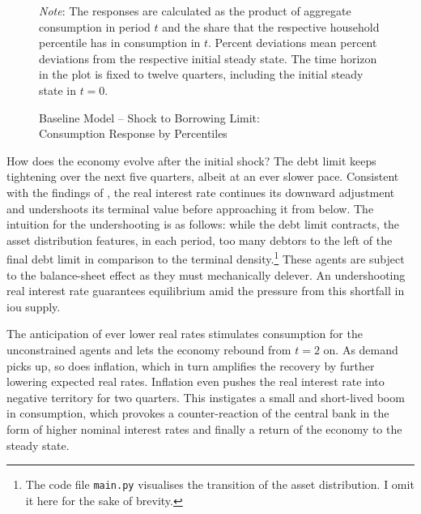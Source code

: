 \documentclass[a4paper,12pt]{article} %
\numberwithin{equation}{section} %
\numberwithin{figure}{section}
\numberwithin{table}{section}
\begin{document}
\begin{figure}[t]
    \centering
    \caption{Baseline Model -- Shock to Borrowing Limit: \\ Consumption Response by Percentiles}
    \label{fig:baseline-permanent-limit-dist-c-response}
    

    \vspace{10pt}
    
    \begin{minipage}{0.75\textwidth} 
    \footnotesize
    \textit{Note}: The responses are calculated as the product of aggregate consumption in period $t$ and the share that the respective household percentile has in consumption in $t$. Percent deviations mean percent deviations from the respective initial steady state. The time horizon in the plot is fixed to twelve quarters, including the initial steady state in $t=0$.
    \end{minipage}
\end{figure}

How does the economy evolve after the initial shock? The debt limit keeps tightening over the next five quarters, albeit at an ever slower pace. Consistent with the findings of \textcite{gl2017}, the real interest rate continues its downward adjustment and undershoots its terminal value before approaching it from below. The intuition for the undershooting is as follows: while the debt limit contracts, the asset distribution features, in each period, too many debtors to the left of the final debt limit in comparison to the terminal density.\footnote{The code file \texttt{main.py} visualises the transition of the asset distribution. I omit it here for the sake of brevity.} These agents are subject to the balance-sheet effect as they must mechanically delever. An undershooting real interest rate guarantees equilibrium amid the pressure from this shortfall in \Gls{iou} supply.

The anticipation of ever lower real rates stimulates consumption for the unconstrained agents and lets the economy rebound from $t=2$ on. As demand picks up, so does inflation, which in turn amplifies the recovery by further lowering expected real rates. Inflation even pushes the real interest rate into negative territory for two quarters. This instigates a small and short-lived boom in consumption, which provokes a counter-reaction of the central bank in the form of higher nominal interest rates and finally a return of the economy to the steady state.
\end{document}
